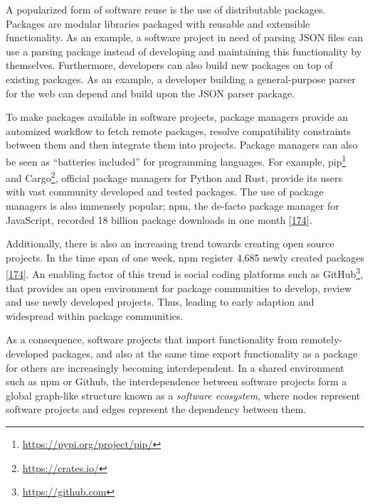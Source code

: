 \documentclass[]{book}
\let\rmarkdownfootnote\footnote%
\def\footnote{\protect\rmarkdownfootnote}
\begin{document}
A popularized form of software reuse is the use of distributable
packages. Packages are modular libraries packaged with reusable and
extensible functionality. As an example, a software project in need of
parsing JSON files can use a parsing package instead of developing and
maintaining this functionality by themselves. Furthermore, developers
can also build new packages on top of existing packages. As an example,
a developer building a general-purpose parser for the web can depend and
build upon the JSON parser package.

To make packages available in software projects, package managers
provide an automized workflow to fetch remote packages, resolve
compatibility constraints between them and then integrate them into
projects. Package managers can also be seen as ``batteries included''
for programming languages. For example, pip\footnote{\url{https://pypi.org/project/pip/}}
and Cargo\footnote{\url{https://crates.io/}}, official package managers
for Python and Rust, provide its users with vast community developed and
tested packages. The use of package managers is also immensely popular;
npm, the de-facto package manager for JavaScript, recorded 18 billion
package downloads in one month
{[}\protect\hyperlink{ref-Linux2016}{174}{]}.

Additionally, there is also an increasing trend towards creating open
source projects. In the time span of one week, npm register 4,685 newly
created packages {[}\protect\hyperlink{ref-Linux2016}{174}{]}. An
enabling factor of this trend is social coding platforms such as
GitHub\footnote{\url{https://github.com}}, that provides an open
environment for package communities to develop, review and use newly
developed projects. Thus, leading to early adaption and widespread
within package communities.

As a consequence, software projects that import functionality from
remotely-developed packages, and also at the same time export
functionality as a package for others are increasingly becoming
interdependent. In a shared environment such as npm or Github, the
interdependence between software projects form a global graph-like
structure known as a \emph{software ecosystem}, where nodes represent
software projects and edges represent the dependency between them.
\end{document}
